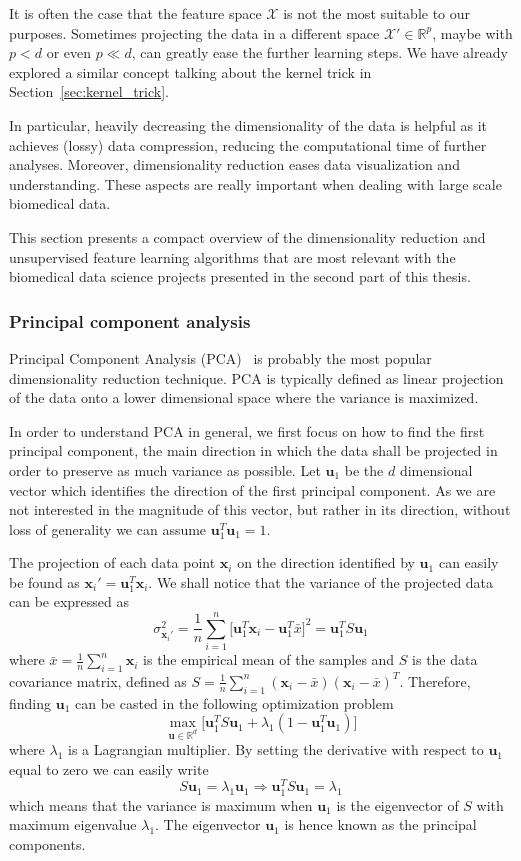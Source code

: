 	It is often the case that the feature space $\mathcal{X}$ is not the most suitable to our purposes. Sometimes projecting the data in a different space $\mathcal{X}' \in \mathbb{R}^p$, maybe with $p<d$ or even $p \ll d$, can greatly ease the further learning steps. We have already explored a similar concept talking about the kernel trick in Section~\ref{sec:kernel_trick}.
	
	In particular, heavily decreasing the dimensionality of the data is helpful as it achieves (lossy) data compression, reducing the computational time of further analyses. Moreover, dimensionality reduction eases data visualization and understanding. These aspects are really important when dealing with large scale biomedical data.
	
	This section presents a compact overview of the dimensionality reduction and unsupervised feature learning algorithms that are most relevant with the biomedical data science projects presented in the second part of this thesis.
	
	\subsubsection{Principal component analysis} \label{sec:pca}
	
	Principal Component Analysis (\ac{PCA})~\cite{jolliffe2002principal} is probably the most popular dimensionality reduction technique. PCA is typically defined as linear projection of the data onto a lower dimensional space where the variance is maximized.
	
	In order to understand PCA in general, we first focus on how to find the first principal component, \ie the main direction in which the data shall be projected in order to preserve as much variance as possible. Let $\bm{u}_1$ be the $d$ dimensional vector which identifies the direction of the first principal component. As we are not interested in the magnitude of this vector, but rather in its direction, without loss of generality we can assume $\bm{u}_1^T\bm{u}_1 = 1$.
	
	The projection of each data point $\bm{x}_i$ on the direction identified by $\bm{u}_1$ can easily be found as $\bm{x}_i' = \bm{u}_1^T\bm{x}_i$. We shall notice that the variance of the projected data can be expressed as
	$$
	\sigma^2_{\bm{x}_i'} = \frac{1}{n} \sum_{i=1}^n \big[\bm{u}_1^T\bm{x}_i - \bm{u}_1^T\bar{x}\big]^2 = \bm{u}_1^T S \bm{u}_1
	$$
	where $\bar{x} = \frac{1}{n} \sum_{i=1}^n \bm{x}_i$ is the empirical mean of the samples and $S$ is the data covariance matrix, defined as $S = \frac{1}{n} \sum_{i=1}^n (\bm{x}_i - \bar{x})(\bm{x}_i - \bar{x})^T$. Therefore, finding $\bm{u}_1$ can be casted in the following optimization problem
	$$
	\max_{\bm{u} \in \mathbb{R}^d} \big[ \bm{u}_1^T S \bm{u}_1 + \lambda_1 (1 - \bm{u}_1^T  \bm{u}_1) \big]
	$$
	where $\lambda_1$ is a Lagrangian multiplier. By setting the derivative with respect to $\bm{u}_1$ equal to zero we can easily write
	$$
	S \bm{u}_1 = \lambda_1 \bm{u}_1 \Rightarrow \bm{u}_1^T S \bm{u}_1 = \lambda_1
	$$
	which means that the variance is maximum when $\bm{u}_1$ is the eigenvector of $S$ with maximum eigenvalue $\lambda_1$. The eigenvector $\bm{u}_1$ is hence known as the principal components.
	
